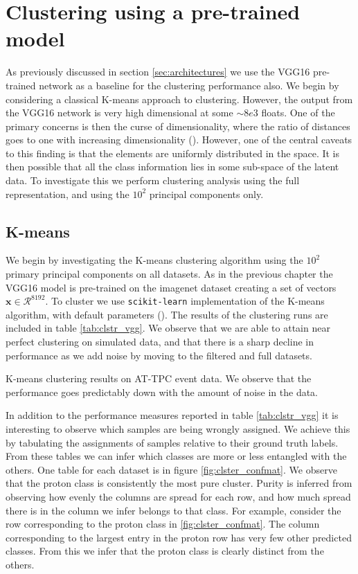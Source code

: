 \section{Clustering using a pre-trained model}

As previously discussed in section \ref{sec:architectures} we use the VGG16 pre-trained network as a baseline for the clustering performance also. We begin by considering a classical K-means approach to clustering. However, the output from the VGG16 network is very high dimensional at some $\sim 8e3$ floats. One of the primary concerns is then the curse of dimensionality, where the ratio of distances goes to one with increasing dimensionality (\cite{Aggarwal}). However, one of the central caveats to this finding is that the elements are uniformly distributed in the space. It is then possible that all the class information lies in some sub-space of the latent data. To investigate this we perform clustering analysis using the full representation, and using the $10^2$ principal components only. 

\subsection{K-means}

We begin by investigating the K-means clustering algorithm using the $10^2$ primary principal components on all datasets. As in the previous chapter the VGG16 model is pre-trained on the imagenet dataset creating a set of vectors $\mathbf{x} \in \mathcal{R}^{8192}$. To cluster we use \lstinline{scikit-learn} implementation of the K-means algorithm, with default parameters (\cite{Pedregosa2011}). The results of the clustering runs are included in table \ref{tab:clstr_vgg}. We observe  that we are able to attain near perfect clustering on simulated data, and that there is a sharp decline in performance as we add noise by moving to the filtered and full datasets. 

\begin{table}[H]
\centering 
\caption[K-means on pre-trained model]{K-means clustering results on AT-TPC event data. We observe that the performance goes predictably down with the amount of noise in the data.}\label{tab:clstr_vgg}

\end{table}


In addition to the performance measures reported in table \ref{tab:clstr_vgg} it is interesting to observe which samples are being wrongly assigned. We achieve this by tabulating the assignments of samples relative to their ground truth labels. From these tables we can infer which classes are more or less entangled with the others. One table for each dataset is in figure \ref{fig:clster_confmat}. We observe that the proton class is consistently the most pure cluster. Purity is inferred from observing how evenly the columns are spread for each row, and how much spread there is in the column we infer belongs to that class. For example, consider the row corresponding to the proton class in \ref{fig:clster_confmat}. The column corresponding to the largest entry in the proton row has very few other predicted classes. From this we infer that the proton class is clearly distinct from the others. 

